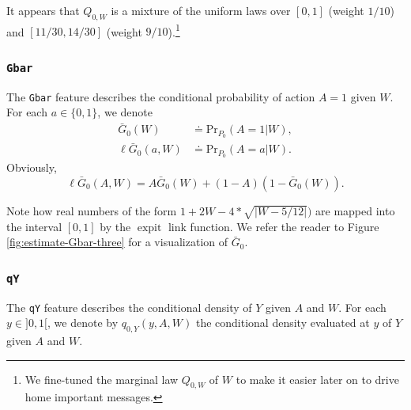\documentclass[11pt,openright,twoside]{book}
\newenvironment{Shaded}{\begin{snugshade}}{\end{snugshade}}
\newcommand{\CommentTok}[1]{\textcolor[rgb]{0.56,0.35,0.01}{\textit{#1}}}
\newcommand{\NormalTok}[1]{#1}
\newcommand{\OperatorTok}[1]{\textcolor[rgb]{0.81,0.36,0.00}{\textbf{#1}}}
\DeclareMathOperator{\expit}{expit}
\newcommand{\defq}{\doteq}
\newcommand{\Gbar}{\bar{G}}
\renewcommand{\Pr}{\textrm{Pr}}
\theoremstyle{definition}
\theoremstyle{definition}
\theoremstyle{definition}
\theoremstyle{remark}
\begin{document}
It appears that \(Q_{0,W}\) is a mixture of the uniform laws over \([0,1]\)
(weight \(1/10\)) and \([11/30,14/30]\) (weight \(9/10\)).\footnote{We fine-tuned the
  marginal law \(Q_{0,W}\) of \(W\) to make it easier later on to drive home
  important messages.}

\hypertarget{gbar}{%
\subsubsection*{\texorpdfstring{\texttt{Gbar}}{Gbar}}\label{gbar}}

The \texttt{Gbar} feature describes the conditional probability of action \(A = 1\)
given \(W\). For each \(a \in \{0,1\}\), we denote \begin{align*}  \Gbar_0(W)
&\defq \Pr_{P_0}(A  = 1 |  W), \\\ell\Gbar_0(a,W)  &\defq \Pr_{P_0}(A =  a |
W).\end{align*} Obviously, \begin{equation*}\ell\Gbar_{0}(A,W)    =
A\Gbar_{0}(W) + (1-A) (1-\Gbar_{0}(W)).\end{equation*}

\begin{Shaded}
\end{Shaded}

Note how real numbers of the form \(1 + 2W - 4 * \sqrt{|W - 5/12|})\) are mapped
into the interval \([0,1]\) by the \(\expit\) link function. We refer the reader
to Figure \ref{fig:estimate-Gbar-three} for a visualization of \(\Gbar_{0}\).

\hypertarget{qy}{%
\subsubsection*{\texorpdfstring{\texttt{qY}}{qY}}\label{qy}}

The \texttt{qY} feature describes the conditional density of \(Y\) given \(A\) and \(W\).
For each \(y\in ]0,1[\), we denote by \(q_{0,Y}(y, A, W)\) the conditional density
evaluated at \(y\) of \(Y\) given \(A\) and \(W\).
\end{document}
